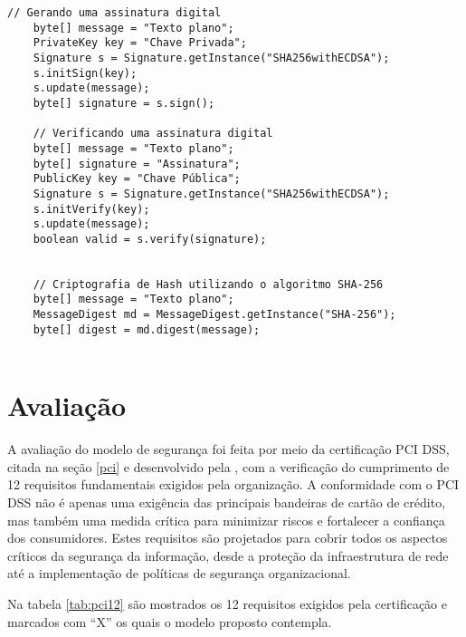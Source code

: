     \begin{scriptsize}
    \estiloJava
    \begin{lstlisting}[caption={Assinatura digital com ECDSA e Hash criptográfico utilizando SHA-256}, label=lst:javacode]
    // Gerando uma assinatura digital
    byte[] message = "Texto plano";
    PrivateKey key = "Chave Privada";
    Signature s = Signature.getInstance("SHA256withECDSA");
    s.initSign(key);
    s.update(message);
    byte[] signature = s.sign();

    // Verificando uma assinatura digital
    byte[] message = "Texto plano";
    byte[] signature = "Assinatura";
    PublicKey key = "Chave Pública";
    Signature s = Signature.getInstance("SHA256withECDSA");
    s.initVerify(key);
    s.update(message);
    boolean valid = s.verify(signature);


    // Criptografia de Hash utilizando o algoritmo SHA-256
    byte[] message = "Texto plano";
    MessageDigest md = MessageDigest.getInstance("SHA-256");
    byte[] digest = md.digest(message);
    
    \end{lstlisting}
    \end{scriptsize}

    \section{Avaliação}

    A avaliação do modelo de segurança foi feita por meio da certificação PCI DSS, citada na seção \ref{pci} e desenvolvido pela , com a verificação do cumprimento de 12 requisitos fundamentais exigidos pela organização. A conformidade com o PCI DSS não é apenas uma exigência das principais bandeiras de cartão de crédito, mas também uma medida crítica para minimizar riscos e fortalecer a confiança dos consumidores. Estes requisitos são projetados para cobrir todos os aspectos críticos da segurança da informação, desde a proteção da infraestrutura de rede até a implementação de políticas de segurança organizacional. 

    Na tabela \ref{tab:pci12} são mostrados os 12 requisitos exigidos pela certificação e marcados com ``X'' os quais o modelo proposto contempla. 

